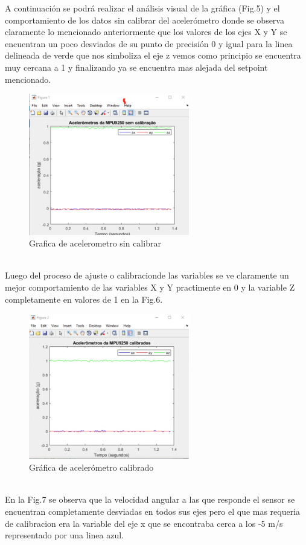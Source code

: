 A continuación se podrá realizar el análisis visual de la gráfica (Fig.5) y el comportamiento de los datos sin calibrar del acelerómetro donde se observa claramente lo mencionado anteriormente que los valores de los ejes X y Y se encuentran un poco desviados de su punto de precisión 0 y igual para la linea delineada de verde que nos simboliza el eje z vemos como principio se encuentra muy cercana a 1 y finalizando ya se encuentra mas alejada del setpoint mencionado.
\begin{figure}[htbp]
\centering
\includegraphics[width=7cm]{Figuras/acelerometro sin calibrar.jpeg}
\caption{Grafica de acelerometro sin calibrar}
\label{fig:acelerometro sin calibrar}
\end{figure}\\
Luego del proceso de ajuste o calibracionde las variables se ve claramente un mejor comportamiento de las variables X y Y practimente en 0 y la variable Z completamente en valores de 1 en la Fig.6.
\begin{figure}[htbp]
\centering
\includegraphics[width=7cm]{Figuras/acelerometro calibrado.jpeg}
\caption{Gráfica de acelerómetro calibrado}
\label{fig:acelerometro calibrado}
\end{figure}\\
En la Fig.7 se observa que la velocidad angular a las que responde el sensor se encuentran completamente desviadas en todos sus ejes pero el que mas requeria de calibracion era la variable del eje x que se encontraba cerca a los -5 m/s representado por una linea azul.\\

